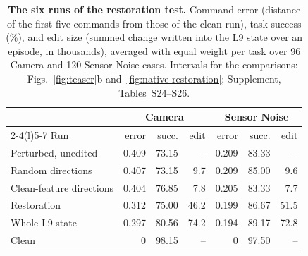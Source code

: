 \begin{table}[t]
\caption{\textbf{The six runs of the restoration test.} Command error (distance of the first five commands from those of the clean run), task success (\%), and edit size (summed change written into the L9 state over an episode, in thousands), averaged with equal weight per task over 96 Camera and 120 Sensor Noise cases. Intervals for the comparisons: Figs.~\ref{fig:teaser}b and~\ref{fig:native-restoration}; Supplement, Tables~S24--S26.}
\label{tab:restoration}
\centering\small
\setlength{\tabcolsep}{2.6pt}
\begin{tabular}{@{}lrrrrrr@{}}
\toprule
 & \multicolumn{3}{c}{Camera} & \multicolumn{3}{c}{Sensor Noise}\\
\cmidrule(lr){2-4}\cmidrule(l){5-7}
Run & error & succ. & edit & error & succ. & edit\\
\midrule
Perturbed, unedited & 0.409 & 73.15 & -- & 0.209 & 83.33 & --\\
Random directions & 0.407 & 73.15 & 9.7 & 0.209 & 85.00 & 9.6\\
Clean-feature directions & 0.404 & 76.85 & 7.8 & 0.205 & 83.33 & 7.7\\
Restoration & 0.312 & 75.00 & 46.2 & 0.199 & 86.67 & 51.5\\
Whole L9 state & 0.297 & 80.56 & 74.2 & 0.194 & 89.17 & 72.8\\
Clean & 0 & 98.15 & -- & 0 & 97.50 & --\\
\bottomrule
\end{tabular}
\end{table}
